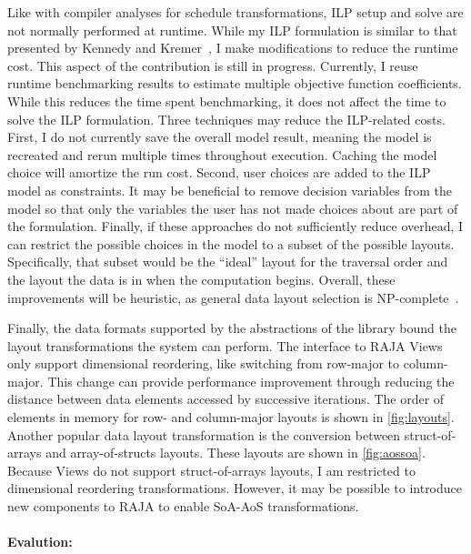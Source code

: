 \documentclass{article}
\begin{document}
Like with compiler analyses for schedule transformations, ILP setup and solve are not normally performed at runtime. 
While my ILP formulation is similar to that presented by Kennedy and Kremer~\cite{kennedy1998automatic}, I make modifications to reduce the runtime cost.
This aspect of the contribution is still in progress.
Currently, I reuse runtime benchmarking results to estimate multiple objective function coefficients.
While this reduces the time spent benchmarking, it does not affect the time to solve the ILP formulation.
Three techniques may reduce the ILP-related costs.
First, I do not currently save the overall model result, meaning the model is recreated and rerun multiple times throughout execution.
Caching the model choice will amortize the run cost.
Second, user choices are added to the ILP model as constraints.
It may be beneficial to remove decision variables from the model so that only the variables the user has not made choices about are part of the formulation.
Finally, if these approaches do not sufficiently reduce overhead, I can restrict the possible choices in the model to a subset of the possible layouts.
Specifically, that subset would be the \enquote{ideal} layout for the traversal order and the layout the data is in when the computation begins.
Overall, these improvements will be heuristic, as general data layout selection is NP-complete~\cite{kennedy1998automatic}.

Finally, the data formats supported by the abstractions of the library bound the layout transformations the system can perform.
The interface to RAJA Views only support dimensional reordering, like switching from row-major to column-major. 
This change can provide performance improvement through reducing the distance between data elements accessed by successive iterations.
The order of elements in memory for row- and column-major layouts is shown in \autoref{fig:layouts}.
Another popular data layout transformation is the conversion between struct-of-arrays and array-of-structs layouts. 
These layouts are shown in \autoref{fig:aossoa}.
Because Views do not support struct-of-arrays layouts, I am restricted to dimensional reordering transformations.
However, it may be possible to introduce new components to RAJA to enable SoA-AoS transformations.


    
\paragraph{Evalution:}
\end{document}
